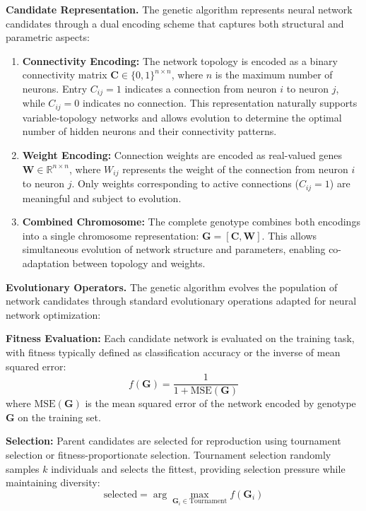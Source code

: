 \textbf{Candidate Representation.} The genetic algorithm represents neural network candidates through a dual encoding scheme that captures both structural and parametric aspects:

\begin{enumerate}
\item \textbf{Connectivity Encoding:} The network topology is encoded as a binary connectivity matrix $\mathbf{C} \in \{0,1\}^{n \times n}$, where $n$ is the maximum number of neurons. Entry $C_{ij} = 1$ indicates a connection from neuron $i$ to neuron $j$, while $C_{ij} = 0$ indicates no connection. This representation naturally supports variable-topology networks and allows evolution to determine the optimal number of hidden neurons and their connectivity patterns.

\item \textbf{Weight Encoding:} Connection weights are encoded as real-valued genes $\mathbf{W} \in \mathbb{R}^{n \times n}$, where $W_{ij}$ represents the weight of the connection from neuron $i$ to neuron $j$. Only weights corresponding to active connections ($C_{ij} = 1$) are meaningful and subject to evolution.

\item \textbf{Combined Chromosome:} The complete genotype combines both encodings into a single chromosome representation: $\mathbf{G} = [\mathbf{C}, \mathbf{W}]$. This allows simultaneous evolution of network structure and parameters, enabling co-adaptation between topology and weights.
\end{enumerate}

\textbf{Evolutionary Operators.} The genetic algorithm evolves the population of network candidates through standard evolutionary operations adapted for neural network optimization:

\textbf{Fitness Evaluation:} Each candidate network is evaluated on the training task, with fitness typically defined as classification accuracy or the inverse of mean squared error:
\begin{equation}
f(\mathbf{G}) = \frac{1}{1 + \text{MSE}(\mathbf{G})}
\end{equation}
where $\text{MSE}(\mathbf{G})$ is the mean squared error of the network encoded by genotype $\mathbf{G}$ on the training set.

\textbf{Selection:} Parent candidates are selected for reproduction using tournament selection or fitness-proportionate selection. Tournament selection randomly samples $k$ individuals and selects the fittest, providing selection pressure while maintaining diversity:
\begin{equation}
\text{selected} = \arg\max_{\mathbf{G}_i \in \text{Tournament}} f(\mathbf{G}_i)
\end{equation}

